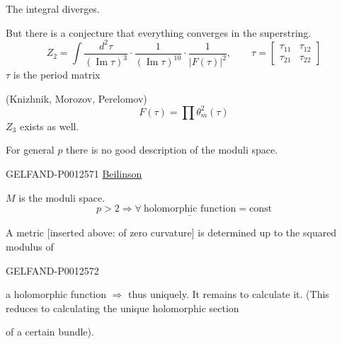 The integral diverges.

But there is a conjecture that everything converges in the superstring.
\begin{equation*}
Z_2=\int\frac{d^2\tau}{(\operatorname{Im}\tau)^3}
\cdot\frac{1}{(\operatorname{Im}\tau)^{10}}\cdot\frac{1}{\lvert F(\tau)\rvert^2},
\qquad
\tau=\begin{bmatrix}\tau_{11}&\tau_{12}\\\tau_{21}&\tau_{22}\end{bmatrix}
\end{equation*}
$\tau$ is the period matrix

(Knizhnik, Morozov, Perelomov)
\begin{equation*}
F(\tau)=\prod\theta_m^2(\tau)
\end{equation*}
$Z_3$ exists as well.

For general $p$ there is no good description of the moduli space.


\begin{GelfandAdjacentEvidence}{GELFAND-P001257}{1}
\underline{Beilinson}

$M$ is the moduli space.
\[
p>2\Rightarrow\forall\ \underline{\text{holomorphic function}}=\mathrm{const}
\]

A metric [inserted above: of zero curvature] is determined up to the squared modulus of
\end{GelfandAdjacentEvidence}
\begin{GelfandAdjacentEvidence}{GELFAND-P001257}{2}

a holomorphic function $\Rightarrow$ thus uniquely.
It remains to calculate it. (This reduces to calculating the unique holomorphic section
\end{GelfandAdjacentEvidence}

of a certain bundle).


